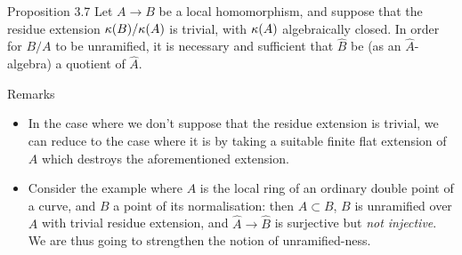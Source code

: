 \begin{itenv}{Proposition 3.7}
\label{I.3.7}
  Let $A\to B$ be a local homomorphism, and suppose that the residue extension $\kappa(B)/\kappa(A)$ is trivial, with $\kappa(A)$ algebraically closed.
  In order for $B/A$ to be unramified, it is necessary and sufficient that $\hat{B}$ be (as an $\hat{A}$-algebra) a quotient of $\hat{A}$.
\end{itenv}

\begin{rmenv}{Remarks}
  \begin{itemize}
    \item In the case where we don't suppose that the residue extension is trivial, we can reduce to the case where it is by taking a suitable finite flat extension of $A$ which destroys the aforementioned extension.
    \item Consider the example where $A$ is the local ring of an ordinary double point of a curve, and $B$ a point of its normalisation:
      then $A\subset B$, $B$ is unramified over $A$ with trivial residue extension,
      and $\hat{A}\to\hat{B}$ is surjective but \emph{not injective}.
    We are thus going to strengthen the notion of unramified-ness.
  \end{itemize}
\end{rmenv}
